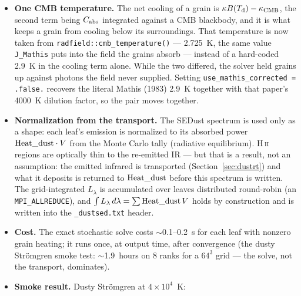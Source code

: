 \documentclass[english,a4paper]{my_memo}
\newcommand{\code}[1]{\texttt{#1}}
\begin{document}
\begin{itemize}
  Lyman limit, and the astrodust grid starts a further decade up, at
  $1.0{\times}10^{-4}\,\mu$m (12.4~keV; DL07 and MRN at
  $6.2{\times}10^{-5}\,\mu$m) --- and measuring the
  grid there would raise the bound by that factor with no photon to justify it,
  coarsening the enthalpy bins (a fixed bin count spread over a
  correspondingly wider window).  The threshold is
  deliberately one-sided: both refinement loops expand a window whose top bin
  is still populated, so an underestimate costs iterations and is recovered,
  while their contraction is guarded and capped.
\item \textbf{One CMB temperature.}  The net cooling of a grain is
  $\kappa B(T_{\rm d}) - \kappa_{\rm CMB}$, the second term being $C_{\rm
  abs}$ integrated against a CMB blackbody, and it is what keeps a grain from
  cooling below its surroundings.  That temperature is now taken from
  \code{radfield::cmb\_temperature()} --- 2.725~K, the same value
  \code{J\_Mathis} puts into the field the grains absorb --- instead of a
  hard-coded 2.9~K in the cooling term alone.  While the two differed, the
  solver held grains up against photons the field never supplied.  Setting
  \code{use\_mathis\_corrected = .false.} recovers the literal Mathis (1983)
  2.9~K together with that paper's 4000~K dilution factor, so the pair moves
  together.
\item \textbf{Normalization from the transport.}  The SEDust spectrum
  is used only as a shape: each leaf's emission is normalized to its
  absorbed power ${\rm Heat\_dust}\cdot V$ from the Monte Carlo tally
  (radiative equilibrium).  H\,\textsc{ii} regions are optically thin
  to the re-emitted IR --- but that is a result, not an assumption:
  the emitted infrared is transported (Section~\ref{sec:dustrt}) and
  what it deposits is returned to ${\rm Heat\_dust}$ before this
  spectrum is written.  The grid-integrated $L_\lambda$ is accumulated
  over leaves distributed round-robin (an \code{MPI\_ALLREDUCE}), and
  $\int L_\lambda\,d\lambda = \sum {\rm Heat\_dust}\,V$ holds by
  construction and is written into the \code{\_dustsed.txt} header.
\item \textbf{Cost.}  The exact stochastic solve costs
  $\sim$0.1--0.2~s for each leaf with nonzero grain heating; it runs
  once, at output time, after convergence (the dusty Str\"omgren
  smoke test: $\sim$1.9~hours on 8 ranks for a $64^3$ grid ---
  the solve, not the transport, dominates).
\item \textbf{Smoke result.}  Dusty Str\"omgren at $4{\times}10^4$~K:

\end{itemize}
\end{document}
